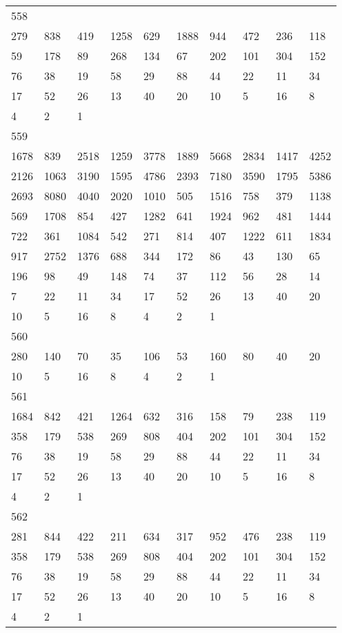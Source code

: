 \begin{longtable}{*{10}{l}}
558&&&&&&&&&\\
279& 838& 419& 1258& 629& 1888& 944& 472& 236& 118\\
59& 178& 89& 268& 134& 67& 202& 101& 304& 152\\
76& 38& 19& 58& 29& 88& 44& 22& 11& 34\\
17& 52& 26& 13& 40& 20& 10& 5& 16& 8\\
4& 2& 1& \\

559&&&&&&&&&\\
1678& 839& 2518& 1259& 3778& 1889& 5668& 2834& 1417& 4252\\
2126& 1063& 3190& 1595& 4786& 2393& 7180& 3590& 1795& 5386\\
2693& 8080& 4040& 2020& 1010& 505& 1516& 758& 379& 1138\\
569& 1708& 854& 427& 1282& 641& 1924& 962& 481& 1444\\
722& 361& 1084& 542& 271& 814& 407& 1222& 611& 1834\\
917& 2752& 1376& 688& 344& 172& 86& 43& 130& 65\\
196& 98& 49& 148& 74& 37& 112& 56& 28& 14\\
7& 22& 11& 34& 17& 52& 26& 13& 40& 20\\
10& 5& 16& 8& 4& 2& 1& \\

560&&&&&&&&&\\
280& 140& 70& 35& 106& 53& 160& 80& 40& 20\\
10& 5& 16& 8& 4& 2& 1& \\

561&&&&&&&&&\\
1684& 842& 421& 1264& 632& 316& 158& 79& 238& 119\\
358& 179& 538& 269& 808& 404& 202& 101& 304& 152\\
76& 38& 19& 58& 29& 88& 44& 22& 11& 34\\
17& 52& 26& 13& 40& 20& 10& 5& 16& 8\\
4& 2& 1& \\

562&&&&&&&&&\\
281& 844& 422& 211& 634& 317& 952& 476& 238& 119\\
358& 179& 538& 269& 808& 404& 202& 101& 304& 152\\
76& 38& 19& 58& 29& 88& 44& 22& 11& 34\\
17& 52& 26& 13& 40& 20& 10& 5& 16& 8\\
4& 2& 1& \\


\end{longtable}
